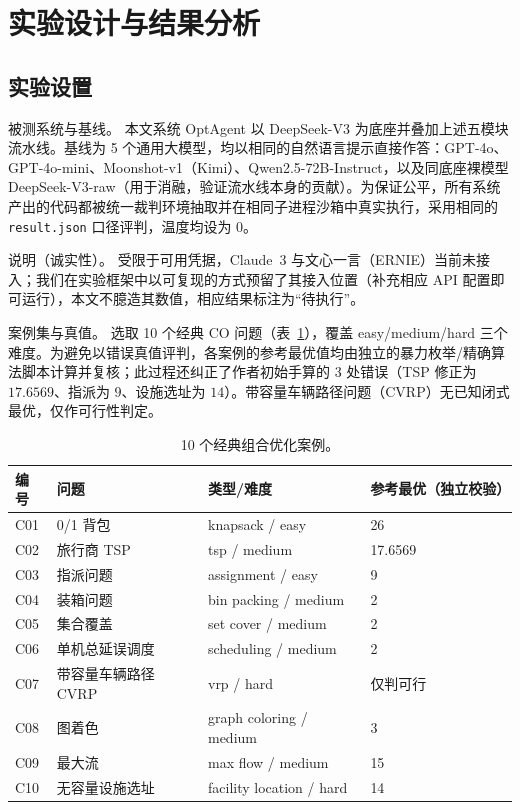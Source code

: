 \documentclass[11pt]{article}
\begin{document}
\section{实验设计与结果分析}\label{sec:exp}

\subsection{实验设置}

被测系统与基线。 本文系统 OptAgent 以 DeepSeek-V3 为底座并叠加上述五模块流水线。基线为 5 个通用大模型，均以相同的自然语言提示直接作答：GPT-4o、GPT-4o-mini、Moonshot-v1（Kimi）、Qwen2.5-72B-Instruct，以及同底座裸模型 DeepSeek-V3-raw（用于消融，验证流水线本身的贡献）。为保证公平，所有系统产出的代码都被统一裁判环境抽取并在相同子进程沙箱中真实执行，采用相同的 \texttt{result.json} 口径评判，温度均设为 0。

说明（诚实性）。 受限于可用凭据，Claude~3 与文心一言（ERNIE）当前未接入；我们在实验框架中以可复现的方式预留了其接入位置（补充相应 API 配置即可运行），本文不臆造其数值，相应结果标注为“待执行”。

案例集与真值。 选取 10 个经典 CO 问题（表~\ref{tab:cases}），覆盖 easy/medium/hard 三个难度。为避免以错误真值评判，各案例的参考最优值均由独立的暴力枚举/精确算法脚本计算并复核；此过程还纠正了作者初始手算的 3 处错误（TSP 修正为 $17.6569$、指派为 $9$、设施选址为 $14$）。带容量车辆路径问题（CVRP）无已知闭式最优，仅作可行性判定。

\begin{table}[t]
\centering
\caption{10 个经典组合优化案例。}
\label{tab:cases}
\small
\begin{tabular}{llll}
\toprule
编号 & 问题 & 类型/难度 & 参考最优（独立校验） \\
\midrule
C01 & 0/1 背包 & knapsack / easy & 26 \\
C02 & 旅行商 TSP & tsp / medium & 17.6569 \\
C03 & 指派问题 & assignment / easy & 9 \\
C04 & 装箱问题 & bin packing / medium & 2 \\
C05 & 集合覆盖 & set cover / medium & 2 \\
C06 & 单机总延误调度 & scheduling / medium & 2 \\
C07 & 带容量车辆路径 CVRP & vrp / hard & 仅判可行 \\
C08 & 图着色 & graph coloring / medium & 3 \\
C09 & 最大流 & max flow / medium & 15 \\
C10 & 无容量设施选址 & facility location / hard & 14 \\
\bottomrule
\end{tabular}
\end{table}
\end{document}
